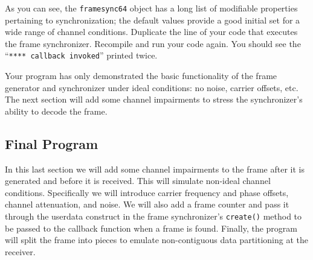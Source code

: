 %
As you can see, the {\tt framesync64} object has a long list of
modifiable properties pertaining to synchronization;
the default values provide a good initial set for a wide range of
channel conditions.
Duplicate the line of your code that executes the frame synchronizer.
Recompile and run your code again.
You should see the ``{\tt ***** callback invoked}'' printed twice.

Your program has only demonstrated the basic functionality of the frame
generator and synchronizer under ideal conditions:
no noise, carrier offsets, etc.
The next section will add some channel impairments to stress the
synchronizer's ability to decode the frame.


%
%
\subsection{Final Program}
\label{tutorial:framing:completed}

In this last section we will add some channel impairments to the frame
after it is generated and before it is received.
This will simulate non-ideal channel conditions.
Specifically we will introduce carrier frequency and phase offsets,
channel attenuation, and noise.
We will also add a frame counter and pass it through the userdata
construct in the frame synchronizer's {\tt create()} method to be passed
to the callback function when a frame is found.
Finally, the program will split the frame into pieces to emulate
non-contiguous data partitioning at the receiver.

